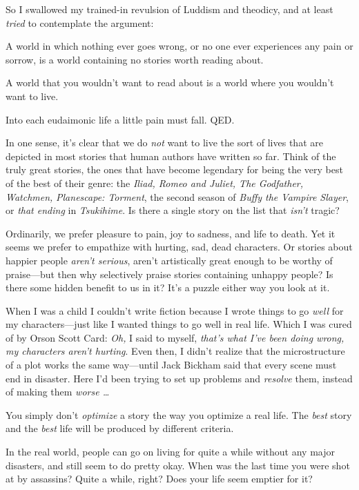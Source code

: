 {
 So I swallowed my trained-in revulsion of Luddism and theodicy,
and at least \textit{tried} to contemplate the argument:}

{
 A world in which nothing ever goes wrong, or no one ever
experiences any pain or sorrow, is a world containing no stories worth
reading about.}

{
 A world that you wouldn't want to read about is a
world where you wouldn't want to live.}

{
 Into each eudaimonic life a little pain must fall. QED.}

{
 In one sense, it's clear that we do \textit{not}
want to live the sort of lives that are depicted in most stories that
human authors have written so far. Think of the truly great stories,
the ones that have become legendary for being the very best of the best
of their genre: the \textit{Iliad, Romeo and Juliet, The Godfather,
Watchmen,} \textit{Planescape: Torment}, the second season of
\textit{Buffy the Vampire Slayer}, or \textit{that ending} in
\textit{Tsukihime}. Is there a single story on the list that
\textit{isn't} tragic?}

{
 Ordinarily, we prefer pleasure to pain, joy to sadness, and life
to death. Yet it seems we prefer to empathize with hurting, sad, dead
characters. Or stories about happier people
\textit{aren't serious}, aren't
artistically great enough to be worthy of praise---but then why
selectively praise stories containing unhappy people? Is there some
hidden benefit to us in it? It's a puzzle either way
you look at it.}

{
 When I was a child I couldn't write fiction
because I wrote things to go \textit{well} for my characters---just
like I wanted things to go well in real life. Which I was cured of by
Orson Scott Card: \textit{Oh,} I said to myself,
\textit{that's what I've been doing
wrong, my characters aren't hurting}. Even then, I
didn't realize that the microstructure of a plot works
the same way---until Jack Bickham said that every scene must end in
disaster. Here I'd been trying to set up problems and
\textit{resolve} them, instead of making them \textit{worse \ldots}}

{
 You simply don't \textit{optimize} a story the way
you optimize a real life. The \textit{best} story and the \textit{best}
life will be produced by different criteria.}

{
 In the real world, people can go on living for quite a while
without any major disasters, and still seem to do pretty okay. When was
the last time you were shot at by assassins? Quite a while, right? Does
your life seem emptier for it?}


